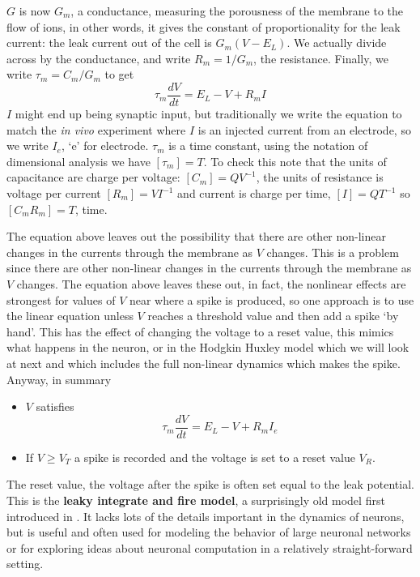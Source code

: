 \documentclass{article}
\begin{document}
$G$ is now $G_m$, a conductance, measuring the porousness of the
membrane to the flow of ions, in other words, it gives the constant of proportionality for the leak current: the leak current out of the cell is
$G_m(V-E_L)$. We actually divide across by the conductance, and write
$R_m=1/G_m$, the resistance. Finally, we write $\tau_m=C_m/G_m$ to get
\begin{equation}
\tau_m\frac{dV}{dt}=E_L-V+R_mI
\end{equation}
$I$ might end up being synaptic input, but traditionally we write the
equation to match the \textsl{in vivo} experiment where $I$ is an
injected current from an electrode, so we write $I_e$, \lq{}e\rq{} for
electrode. $\tau_m$ is a time constant, using the notation of
dimensional analysis we have $[\tau_m]=T$. To check this note that the
units of capacitance are charge per voltage: $[C_m]=QV^{-1}$, the
units of resistance is voltage per current $[R_m]=VI^{-1}$ and current
is charge per time, $[I]=QT^{-1}$ so $[C_mR_m]=T$, time.

The equation above leaves out the possibility that there are other
non-linear changes in the currents through the membrane as $V$
changes. This is a problem since there are other non-linear changes in
the currents through the membrane as $V$ changes. The equation above
leaves these out, in fact, the nonlinear effects are strongest for
values of $V$ near where a spike is produced, so one approach is to
use the linear equation unless $V$ reaches a threshold value and then
add a spike \lq{}by hand\rq{}. This has the effect of changing the
voltage to a reset value, this mimics what happens in the neuron, or
in the Hodgkin Huxley model which we will look at next and which
includes the full non-linear dynamics which makes the spike. Anyway,
in summary
\begin{itemize}
\item $V$ satisfies
\begin{equation}
\tau_m\frac{dV}{dt}=E_L-V+R_mI_e
\end{equation}
\item If $V\ge V_T$ a spike is recorded and the voltage is set to a
  reset value $V_R$.
\end{itemize}
The reset value, the voltage after the spike is often set equal to the
 leak potential. This is the \textbf{leaky integrate and fire model}, a surprisingly
old model first introduced in \cite{Lapicque1907a}. It lacks lots of
the details important in the dynamics of neurons, but is useful and
often used for modeling the behavior of large neuronal networks or for
exploring ideas about neuronal computation in a relatively
straight-forward setting.
\end{document}
